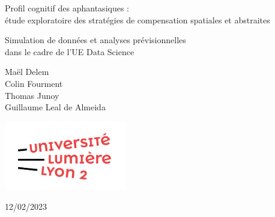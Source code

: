 \begin{titlepage}
    \begin{center}
        \vspace*{1cm}

        \Huge
        Profil cognitif des aphantasiques :\\ étude exploratoire des stratégies de compensation spatiales et abstraites

        \vspace{0.5cm}
        \Large
        Simulation de données et analyses prévisionnelles\\ dans le cadre de l'UE Data Science
            
        \vfill
        \normalsize
        Maël Delem\\
        Colin Fourment\\
        Thomas Junoy\\
        Guillaume Leal de Almeida\\

            
        \vspace{0.8cm}
    
        \includegraphics[width=0.4\textwidth]{./logo/logo.png}
            
        12/02/2023
            
    \end{center}
\end{titlepage}

\newpage{}
